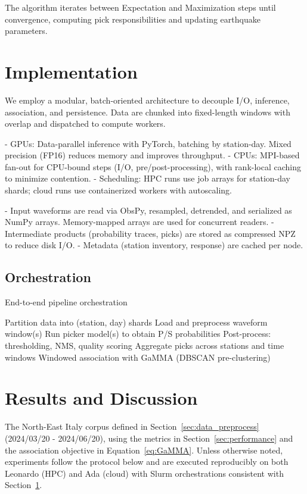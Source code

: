 \documentclass{llncs}
\begin{document}
The algorithm iterates between Expectation and Maximization steps until 
convergence, computing pick responsibilities and updating earthquake 
parameters.

\section{Implementation}
\label{sec:implementation}
We employ a modular, batch-oriented architecture to decouple I/O, inference, 
association, and persistence. Data are chunked into fixed-length windows with 
overlap and dispatched to compute workers.

- GPUs: Data-parallel inference with PyTorch, batching by station-day. Mixed 
precision (FP16) reduces memory and improves throughput.
- CPUs: MPI-based fan-out for CPU-bound steps (I/O, pre/post-processing), with 
rank-local caching to minimize contention.
- Scheduling: HPC runs use job arrays for station-day shards; cloud runs use 
containerized workers with autoscaling.

- Input waveforms are read via ObsPy, resampled, detrended, and serialized as 
NumPy arrays. Memory-mapped arrays are used for concurrent readers.
- Intermediate products (probability traces, picks) are stored as compressed 
NPZ to reduce disk I/O.
- Metadata (station inventory, response) are cached per node.

\subsection{Orchestration}
\begin{algorithm}[H]
\caption{End-to-end pipeline orchestration}
\begin{algorithmic}[1]
\STATE Partition data into (station, day) shards
  \STATE Load and preprocess waveform window(s)
  \STATE Run picker model(s) to obtain P/S probabilities
  \STATE Post-process: thresholding, NMS, quality scoring
  \STATE Aggregate picks across stations and time windows
\ENDFOR
\STATE Windowed association with GaMMA (DBSCAN pre-clustering)
\end{algorithmic}
\end{algorithm}

\section{Results and Discussion}
\label{sec:results}
The North-East Italy corpus defined in Section~\ref{sec:data_preprocess} 
(2024/03/20 - 2024/06/20), using the metrics in Section~\ref{sec:performance} 
and the association objective in Equation~\eqref{eq:GaMMA}. Unless otherwise 
noted, experiments follow the protocol below and are executed reproducibly on 
both Leonardo (HPC) and Ada (cloud) with Slurm orchestrations consistent with 
Section~\ref{sec:implementation}.
\end{document}
